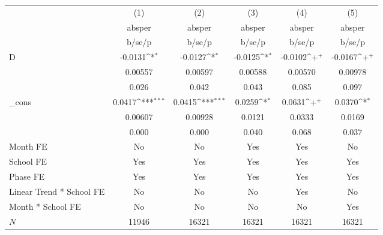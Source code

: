 {
\def\sym#1{\ifmmode^{#1}\else\(^{#1}\)\fi}
\begin{tabular}{l*{5}{c}}
\hline\hline
            &\multicolumn{1}{c}{(1)}&\multicolumn{1}{c}{(2)}&\multicolumn{1}{c}{(3)}&\multicolumn{1}{c}{(4)}&\multicolumn{1}{c}{(5)}\\
            &\multicolumn{1}{c}{absper}&\multicolumn{1}{c}{absper}&\multicolumn{1}{c}{absper}&\multicolumn{1}{c}{absper}&\multicolumn{1}{c}{absper}\\
            &      b/se/p         &      b/se/p         &      b/se/p         &      b/se/p         &      b/se/p         \\
\hline
D           &     -0.0131\sym{*}  &     -0.0127\sym{*}  &     -0.0125\sym{*}  &     -0.0102\sym{+}  &     -0.0167\sym{+}  \\
            &     0.00557         &     0.00597         &     0.00588         &     0.00570         &     0.00978         \\
            &       0.026         &       0.042         &       0.043         &       0.085         &       0.097         \\
\_cons      &      0.0417\sym{***}&      0.0415\sym{***}&      0.0259\sym{*}  &      0.0631\sym{+}  &      0.0370\sym{*}  \\
            &     0.00607         &     0.00928         &      0.0121         &      0.0333         &      0.0169         \\
            &       0.000         &       0.000         &       0.040         &       0.068         &       0.037         \\
Month FE    &          No         &          No         &         Yes         &         Yes         &          No         \\
School FE   &         Yes         &         Yes         &         Yes         &         Yes         &         Yes         \\
Phase FE    &         Yes         &         Yes         &         Yes         &         Yes         &         Yes         \\
Linear Trend * School FE &          No         &          No         &          No         &         Yes         &          No         \\
Month * School FE &          No         &          No         &          No         &          No         &         Yes         \\
\hline
\(N\)       &       11946         &       16321         &       16321         &       16321         &       16321         \\

\end{tabular}}
